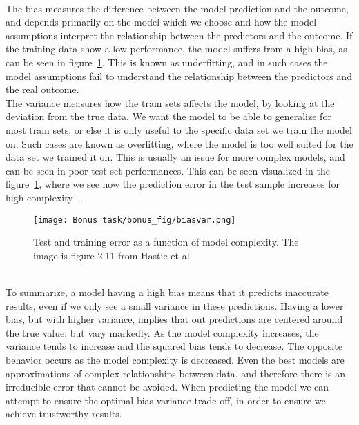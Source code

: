 \documentclass[reprint,english,notitlepage]{revtex4-1}  %
\begin{document}
\\
The bias measures the difference between the model prediction and the outcome, and depends primarily on the model which we choose and how the model assumptions interpret the relationship between the predictors and the outcome. 
If the training data show a low performance, the model suffers from a high bias, as can be seen in figure~\ref{fig: biasvar}. This is known as underfitting, and in such cases the model assumptions fail to understand the relationship between the predictors and the real outcome. 
\vspace{3mm}
\\ 
The variance measures how the train sets affects the model, by looking at the deviation from the true data. We want the model to be able to generalize for most train sets, or else it is only useful to the specific data set we train the model on. Such cases are known as overfitting, where the model is too well suited for the data set we trained it on. This is usually an issue for more complex models, and can be seen in poor test set performances. This can be seen visualized in the figure~\ref{fig: biasvar}, where we see how the prediction error in the test sample increases for high complexity~\cite{morthen}. 
\begin{figure}[h!]
    \centering %
    \texttt{[image: Bonus task/bonus\_fig/biasvar.png]} 
    \caption{Test and training error as a function of model complexity. The image is figure 2.11 from Hastie et al.~\cite{friedman}}
    \label{fig: biasvar}
\end{figure}
\vspace{3mm}
\\ 
To summarize, a model having a high bias means that it predicts inaccurate results, even if we only see a small variance in these predictions. 
Having a lower bias, but with higher variance, implies that out predictions are centered around the true value, but vary markedly.
As the model complexity increases, the variance tends to increase and the squared bias tends to decrease. The opposite behavior occurs as the model complexity is decreased. 
Even the best models are approximations of complex relationships between data, and therefore there is an irreducible error that cannot be avoided. 
When predicting the model we can attempt to ensure the optimal bias-variance trade-off, in order to ensure we achieve trustworthy results. 
\vspace{3mm}
\\
\end{document}
